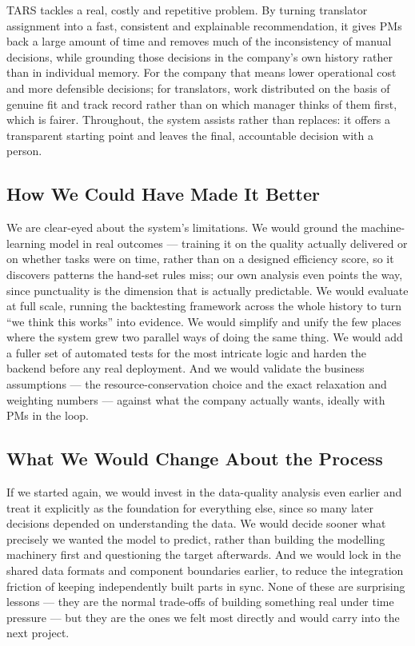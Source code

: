 \documentclass[9pt,a4paper,twoside]{utils/tau-class/tau}
\begin{document}
TARS tackles a real, costly and repetitive problem. By turning translator assignment into a fast, consistent and explainable recommendation, it gives PMs back a large amount of time and removes much of the inconsistency of manual decisions, while grounding those decisions in the company's own history rather than in individual memory. For the company that means lower operational cost and more defensible decisions; for translators, work distributed on the basis of genuine fit and track record rather than on which manager thinks of them first, which is fairer. Throughout, the system assists rather than replaces: it offers a transparent starting point and leaves the final, accountable decision with a person.

\subsection{How We Could Have Made It Better}

We are clear-eyed about the system's limitations. We would ground the machine-learning model in real outcomes --- training it on the quality actually delivered or on whether tasks were on time, rather than on a designed efficiency score, so it discovers patterns the hand-set rules miss; our own analysis even points the way, since punctuality is the dimension that is actually predictable. We would evaluate at full scale, running the backtesting framework across the whole history to turn ``we think this works'' into evidence. We would simplify and unify the few places where the system grew two parallel ways of doing the same thing. We would add a fuller set of automated tests for the most intricate logic and harden the backend before any real deployment. And we would validate the business assumptions --- the resource-conservation choice and the exact relaxation and weighting numbers --- against what the company actually wants, ideally with PMs in the loop.

\subsection{What We Would Change About the Process}

If we started again, we would invest in the data-quality analysis even earlier and treat it explicitly as the foundation for everything else, since so many later decisions depended on understanding the data. We would decide sooner what precisely we wanted the model to predict, rather than building the modelling machinery first and questioning the target afterwards. And we would lock in the shared data formats and component boundaries earlier, to reduce the integration friction of keeping independently built parts in sync. None of these are surprising lessons --- they are the normal trade-offs of building something real under time pressure --- but they are the ones we felt most directly and would carry into the next project.
\end{document}
